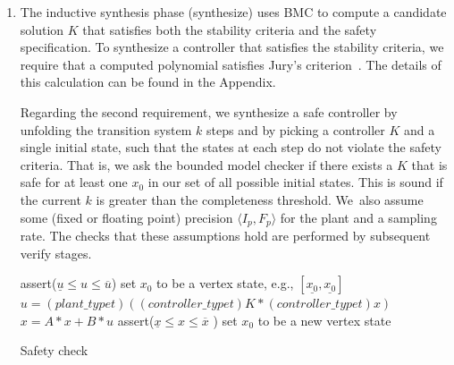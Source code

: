 \documentclass[twocolumn]{autart}    %
\begin{document}
\begin{enumerate}

\item The inductive synthesis phase ({\sc synthesize}) uses BMC to compute a
candidate solution $K$ that satisfies both the stability criteria and the
safety specification.  To synthesize a controller that satisfies the
stability criteria, we require that a computed polynomial satisfies Jury's
criterion~\cite{fadali}.  The details of this calculation can be found in
the Appendix.

Regarding the second requirement, we synthesize a safe controller by
unfolding the transition system $k$ steps and by picking a controller $K$
and a single initial state, such that the states at each step do not violate
the safety criteria.  That is, we ask the bounded model checker if there
exists a $K$ that is safe for at least one $x_0$ in our set of all possible
initial states.  This is sound if the current $k$ is greater than the completeness
threshold.  We~also assume some (fixed or floating point) precision $\langle I_p,F_p\rangle$ for the
plant and a sampling rate.  The checks that these assumptions hold are
performed by subsequent {\sc verify} stages.



\begin{algorithm}[]
\begin{algorithmic}[1]
\State assert($ \underline{u}  \leq u \leq \overline{u}$)
 \State set $x_0$ to be a vertex state, e.g., $[\underline{x_0},\underline{x_0}]$	
		\State $u = (plant\_typet)((controller\_typet)K * (controller\_typet) x)$
		\State $x = A * x + B * u$
		\State assert($\underline{x} \leq x \leq \overline{x}$ )
  	\EndFor
  	\State set $x_0$ to be a new vertex state
  	\EndFor
\EndFunction
\end{algorithmic}
\caption{Safety check\label{alg:safetycheck}}
\end{algorithm}


\end{enumerate}
\end{document}
